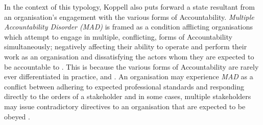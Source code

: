 In the context of this typology, Koppell also puts forward a state resultant from an organisation's engagement with the various forms of Accountability. \textit{Multiple Accountability Disorder (MAD)} is framed as a condition afflicting organisations which attempt to engage in multiple, conflicting, forms of Accountability simultaneously; negatively affecting their ability to operate and perform their work as an organisation and dissatisfying the actors whom they are expected to be accountable to \cite{koppell_pathologies_2005}. This is because the various forms of Accountability are rarely ever differentiated in practice, and  \cite{koppell_pathologies_2005}. An organisation may experience \textit{MAD} as a conflict between adhering to expected professional standards and responding directly to the orders of a stakeholder and in some cases, multiple stakeholders may issue contradictory directives to an organisation that are expected to be obeyed \cite{koppell_pathologies_2005}.



%
%

